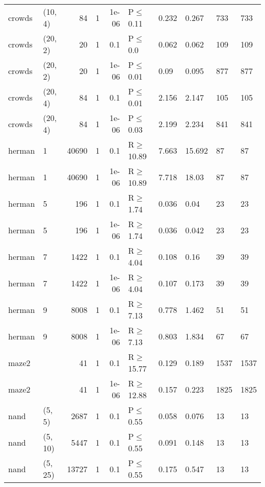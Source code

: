 \begin{longtable}{llrrrlllll}
 crowds        & (10, 4)   &     	84 & 1 & 1e-06 & P$\leq$0.11  & 0.232  & 0.267   & 733     & 733     \\
 crowds        & (20, 2)   &     	20 & 1 & 0.1   & P$\leq$0.0   & 0.062  & 0.062   & 109     & 109     \\
 crowds        & (20, 2)   &     	20 & 1 & 1e-06 & P$\leq$0.01  & 0.09   & 0.095   & 877     & 877     \\
 crowds        & (20, 4)   &     	84 & 1 & 0.1   & P$\leq$0.01  & 2.156  & 2.147   & 105     & 105     \\
 crowds        & (20, 4)   &     	84 & 1 & 1e-06 & P$\leq$0.03  & 2.199  & 2.234   & 841     & 841     \\
 herman        & 1         &  	40690 & 1 & 0.1   & R$\geq$10.89 & 7.663  & 15.692  & 87      & 87      \\
 herman        & 1         &  	40690 & 1 & 1e-06 & R$\geq$10.89 & 7.718  & 18.03   & 87      & 87      \\
 herman        & 5         &    	196 & 1 & 0.1   & R$\geq$1.74  & 0.036  & 0.04    & 23      & 23      \\
 herman        & 5         &    	196 & 1 & 1e-06 & R$\geq$1.74  & 0.036  & 0.042   & 23      & 23      \\
 herman        & 7         &   	1422 & 1 & 0.1   & R$\geq$4.04  & 0.108  & 0.16    & 39      & 39      \\
 herman        & 7         &   	1422 & 1 & 1e-06 & R$\geq$4.04  & 0.107  & 0.173   & 39      & 39      \\
 herman        & 9         &   	8008 & 1 & 0.1   & R$\geq$7.13  & 0.778  & 1.462   & 51      & 51      \\
 herman        & 9         &   	8008 & 1 & 1e-06 & R$\geq$7.13  & 0.803  & 1.834   & 67      & 67      \\
 maze2         &           &     	41 & 1 & 0.1   & R$\geq$15.77 & 0.129  & 0.189   & 1537    & 1537    \\
 maze2         &           &     	41 & 1 & 1e-06 & R$\geq$12.88 & 0.157  & 0.223   & 1825    & 1825    \\
 nand          & (5, 5)    &   	2687 & 1 & 0.1   & P$\leq$0.55  & 0.058  & 0.076   & 13      & 13      \\
 nand          & (5, 10)   &   	5447 & 1 & 0.1   & P$\leq$0.55  & 0.091  & 0.148   & 13      & 13      \\
 nand          & (5, 25)   &  	13727 & 1 & 0.1   & P$\leq$0.55  & 0.175  & 0.547   & 13      & 13      \\

\end{longtable}
